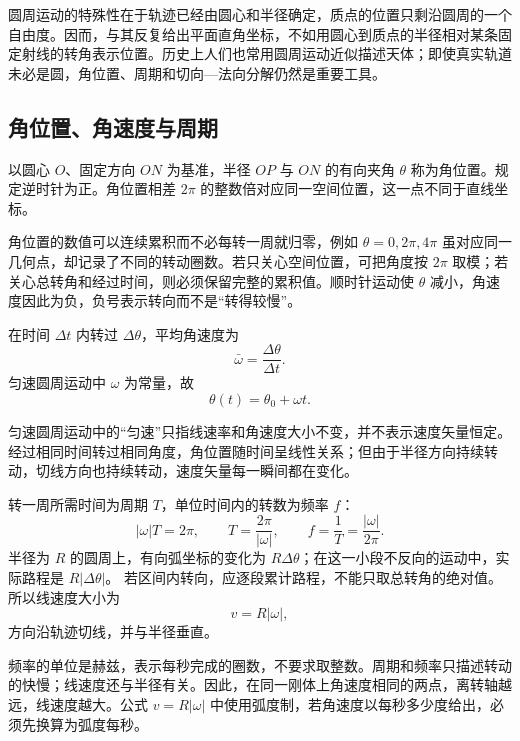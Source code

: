 {圆周运动的特殊性在于轨迹已经由圆心和半径确定，质点的位置只剩沿圆周的一个自由度。因而，与其反复给出平面直角坐标，不如用圆心到质点的半径相对某条固定射线的转角表示位置。历史上人们也常用圆周运动近似描述天体；即使真实轨道未必是圆，角位置、周期和切向—法向分解仍然是重要工具。

\subsection{角位置、角速度与周期}

\CirclePositionDiagram

以圆心 $O$、固定方向 $ON$ 为基准，半径 $OP$ 与 $ON$ 的有向夹角 $\theta$ 称为角位置。规定逆时针为正。角位置相差 $2\pi$ 的整数倍对应同一空间位置，这一点不同于直线坐标。

角位置的数值可以连续累积而不必每转一周就归零，例如 $\theta=0,2\pi,4\pi$ 虽对应同一几何点，却记录了不同的转动圈数。若只关心空间位置，可把角度按 $2\pi$ 取模；若关心总转角和经过时间，则必须保留完整的累积值。顺时针运动使 $\theta$ 减小，角速度因此为负，负号表示转向而不是“转得较慢”。

在时间 $\Delta t$ 内转过 $\Delta\theta$，平均角速度为
\begin{equation}
 \bar\omega=\frac{\Delta\theta}{\Delta t}.
\end{equation}
匀速圆周运动中 $\omega$ 为常量，故
\begin{equation}
 \theta(t)=\theta_0+\omega t.
\end{equation}

\AngularSignDiagram

匀速圆周运动中的“匀速”只指线速率和角速度大小不变，并不表示速度矢量恒定。经过相同时间转过相同角度，角位置随时间呈线性关系；但由于半径方向持续转动，切线方向也持续转动，速度矢量每一瞬间都在变化。

转一周所需时间为周期 $T$，单位时间内的转数为频率 $f$：
\begin{equation}
 |\omega|T=2\pi,\qquad T=\frac{2\pi}{|\omega|},\qquad
 f=\frac1T=\frac{|\omega|}{2\pi}.
\end{equation}
半径为 $R$ 的圆周上，有向弧坐标的变化为 $R\Delta\theta$；在这一小段不反向的运动中，实际路程是 $R|\Delta\theta|$。
若区间内转向，应逐段累计路程，不能只取总转角的绝对值。所以线速度大小为
\begin{equation}
 v=R|\omega|,
\end{equation}
方向沿轨迹切线，并与半径垂直。

频率的单位是赫兹，表示每秒完成的圈数，不要求取整数。周期和频率只描述转动的快慢；线速度还与半径有关。因此，在同一刚体上角速度相同的两点，离转轴越远，线速度越大。公式 $v=R|\omega|$ 中使用弧度制，若角速度以每秒多少度给出，必须先换算为弧度每秒。

}
